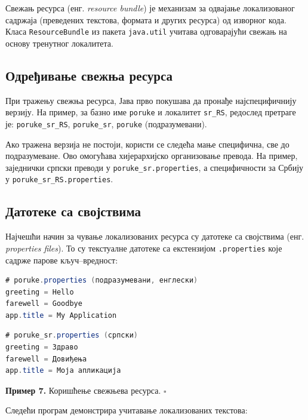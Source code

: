 Свежањ ресурса (енг. \textit{resource bundle}) је механизам за одвајање локализованог садржаја (преведених текстова, формата и других ресурса) од изворног кода. Класа \texttt{ResourceBundle} из пакета \texttt{java.util} учитава одговарајући свежањ на основу тренутног локалитета.


\subsection{Одређивање свежња ресурса}

При тражењу свежња ресурса, Јава прво покушава да пронађе најспецифичнију верзију. На пример, за базно име \texttt{poruke} и локалитет \texttt{sr\_RS}, редослед претраге је: \texttt{poruke\_sr\_RS}, \texttt{poruke\_sr}, \texttt{poruke} (подразумевани).

Ако тражена верзија не постоји, користи се следећа мање специфична, све до подразумеване. Ово омогућава хијерархијско организовање превода. На пример, заједнички српски преводи у \texttt{poruke\_sr.properties}, а специфичности за Србију у \texttt{poruke\_sr\_RS.properties}.


\subsection{Датотеке са својствима}

Најчешћи начин за чување локализованих ресурса су датотеке са својствима (енг. \textit{properties files}). То су текстуалне датотеке са екстензијом \texttt{.properties} које садрже парове кључ–вредност:


\begin{lstlisting}[language=Java]
# poruke.properties (подразумевани, енглески)
greeting = Hello
farewell = Goodbye
app.title = My Application
\end{lstlisting}


\begin{lstlisting}[language=Java]
# poruke_sr.properties (српски)
greeting = Здраво
farewell = Довиђења
app.title = Моја апликација
\end{lstlisting}


\bigskip

\noindent \textbf{Пример 7.} Коришћење свежњева ресурса. $\square$

\medskip

Следећи програм демонстрира учитавање локализованих текстова:


